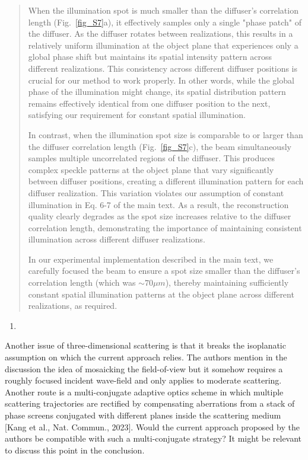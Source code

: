 \documentclass[12pt]{article}
\newenvironment{solved_reviewercomment}
    {\begin{tcolorbox}[width=\linewidth,colback=gray!5,colframe=solved_commentcolor!50,title=Reviewer Comment,left=5pt,right=5pt]}
    {\end{tcolorbox}}
\newenvironment{ourresponse}
    {\begin{tcolorbox}[width=\linewidth,breakable,enhanced,colback=gray!5,colframe=responsecolor!50,title=Response,left=5pt,right=5pt]}
    {\end{tcolorbox}}
\begin{document}
\begin{ourresponse}
\begin{quote}
When the illumination spot is much smaller than the diffuser's correlation length (Fig.~\ref{fig_S7}a), it effectively samples only a single "phase patch" of the diffuser. As the diffuser rotates between realizations, this results in a relatively uniform illumination at the object plane that experiences only a global phase shift but maintains its spatial intensity pattern across different realizations. This consistency across different diffuser positions is crucial for our method to work properly. In other words, while the global phase of the illumination might change, its spatial distribution pattern remains effectively identical from one diffuser position to the next, satisfying our requirement for constant spatial illumination.

In contrast, when the illumination spot size is comparable to or larger than the diffuser correlation length (Fig.~\ref{fig_S7}c), the beam simultaneously samples multiple uncorrelated regions of the diffuser. This produces complex speckle patterns at the object plane that vary significantly between diffuser positions, creating a different illumination pattern for each diffuser realization. This variation violates our assumption of constant illumination in Eq. 6-7 of the main text. As a result, the reconstruction quality clearly degrades as the spot size increases relative to the diffuser correlation length, demonstrating the importance of maintaining consistent illumination across different diffuser realizations.


In our experimental implementation described in the main text, we carefully focused the beam to ensure a spot size smaller than the diffuser's correlation length (which was $\sim 70 \mu m$), thereby maintaining sufficiently constant spatial illumination patterns at the object plane across different realizations, as required.
\end{quote}

\end{ourresponse}


\begin{enumerate}[label=\arabic*., resume]
\item \leavevmode
\end{enumerate}
\vspace{-1em}
\begin{solved_reviewercomment}
    Another issue of three-dimensional scattering is that it breaks the isoplanatic assumption on which the current approach relies. The authors mention in the discussion the idea of mosaicking the field-of-view but it somehow requires a roughly focused incident wave-field and only applies to moderate scattering. Another route is a multi-conjugate adaptive optics scheme in which multiple scattering trajectories are rectified by compensating aberrations from a stack of phase screens conjugated with different planes inside the scattering medium [Kang et al., Nat. Commun., 2023]. Would the current approach proposed by the authors be compatible with such a multi-conjugate strategy? It might be relevant to discuss this point in the conclusion.
\end{solved_reviewercomment}
\end{document}
